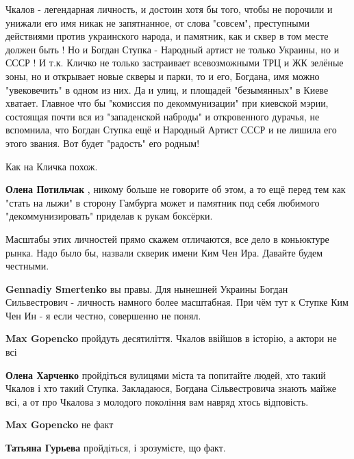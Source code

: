 \begin{itemize}
Чкалов - легендарная личность, и достоин хотя бы того, чтобы не порочили и
унижали его имя никак не запятнанное, от слова "совсем", преступными действиями
против украинского народа, и памятник, как и сквер в том месте должен быть ! Но
и Богдан Ступка - Народный артист не только Украины, но и СССР ! И т.к. Кличко
не только застраивает всевозможными ТРЦ и ЖК зелёные зоны, но и открывает новые
скверы и парки, то и его, Богдана, имя можно "увековечить" в одном из них. Да
и улиц, и площадей "безымянных" в Киеве хватает. Главное что бы "комиссия по
декоммунизации" при киевской мэрии, состоящая почти вся из "западенской
наброды" и откровенного дурачья, не вспомнила, что Богдан Ступка ещё и Народный
Артист СССР и не лишила его этого звания. Вот будет "радость" его родным!


Как на Кличка похож.

\begin{itemize} %
\textbf{Олена Потильчак} , никому больше не говорите об этом, а то ещё перед тем как "стать на лыжи" в сторону Гамбурга может и памятник под себя любимого "декоммунизировать" приделав к рукам боксёрки.
\end{itemize} %

Масштабы этих личностей прямо скажем отличаются, все дело в коньюктуре рынка.
Надо было бы, назвали скверик имени Ким Чен Ира.
Давайте будем честными.

\begin{itemize} %
\textbf{Gennadiy Smertenko} вы правы. Для нынешней Украины Богдан Сильвестрович - личность намного более масштабная. При чём тут к Ступке Ким Чен Ин - я если честно, совершенно не понял.

\begin{itemize} %
\textbf{Max Gopencko} пройдуть десятиліття. Чкалов ввійшов в історію, а актори не всі

\textbf{Олена Харченко} пройдіться вулицями міста та попитайте людей, хто такий Чкалов і хто такий Ступка. Закладаюся, Богдана Сільвестровича знають майже всі, а от про Чкалова з молодого покоління вам навряд хтось відповість.

\textbf{Max Gopencko} не факт

\textbf{Татьяна Гурьева} пройдіться, і зрозумієте, що факт.
\end{itemize} %


\end{itemize}
\end{itemize}
